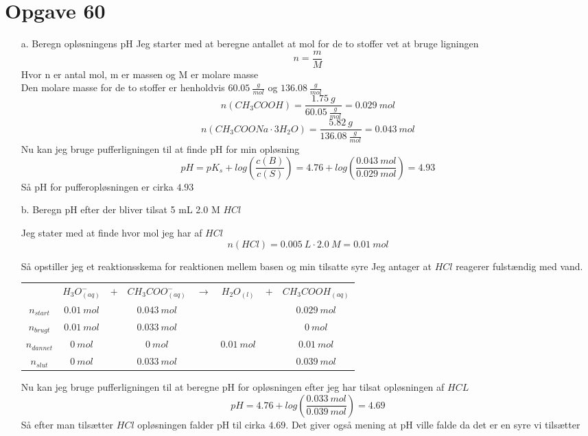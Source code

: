 \documentclass[12pt]{article}
\begin{document}
\section*{Opgave 60}
\begin{enumerate}
  \item[a.] Beregn opløsningens pH
Jeg starter med at beregne antallet at mol for de to stoffer vet at bruge ligningen
$$n = \frac{m}{M}$$
Hvor n er antal mol, m er massen og M er molare masse\\
Den molare masse for de to stoffer er henholdvis $60.05 \ \frac{g}{mol}$ og $136.08 \ \frac{g}{mol}$
$$n(CH_3COOH) = \frac{1.75 \ g}{60.05 \ \frac{g}{mol}} = 0.029 \ mol$$
$$n(CH_3COONa \cdot 3H_2O) = \frac{5.82 \ g}{136.08 \ \frac{g}{mol}} = 0.043 \ mol$$
Nu kan jeg bruge pufferligningen til at finde pH for min opløsning
$$pH = pK_s + log(\frac{c(B)}{c(S)}) = 4.76 + log(\frac{0.043 \ mol}{0.029 \ mol}) = 4.93$$
Så pH for pufferopløsningen er cirka $4.93$

  \item[b.] Beregn pH efter der bliver tilsat 5 mL 2.0 M $HCl$

Jeg stater med at finde hvor mol jeg har af $HCl$
$$n(HCl) = 0.005 \ L \cdot 2.0 \ M = 0.01 \ mol$$

Så opstiller jeg et reaktionsskema for reaktionen mellem basen og min tilsatte syre
Jeg antager at $HCl$ reagerer fulstændig med vand.

\begin{center}
  \begin{tabular}{c c c c c c c c}

    & $H_3O^{-}_(aq)$ & $+$ & $CH_3COO^{-}_{(aq)}$ & $\rightarrow$ & $H_2O_{(l)}$ & $+$ & $CH_3COOH_{(aq)}$\\
    $n_{start}$ & $0.01 \ mol$ && $0.043 \ mol$ &&&& $0.029 \ mol$\\
    $n_{brugt}$ & $0.01 \ mol$ && $0.033 \ mol$ &&&& $0 \ mol$\\
    $n_{dannet}$ & $0 \ mol$ && $0 \ mol$ && $0.01 \ mol$ && $0.01 \ mol$\\
    $n_{slut}$ & $0 \ mol$ && $0.033 \ mol$ &&&& $0.039 \ mol$

  \end{tabular}
\end{center}

Nu kan jeg bruge pufferligningen til at beregne pH for opløsningen efter jeg har tilsat opløsningen af $HCL$
$$pH = 4.76 + log(\frac{0.033 \ mol}{0.039 \ mol}) = 4.69$$
Så efter man tilsætter $HCl$ opløsningen falder pH til cirka $4.69$. Det giver også mening at pH ville falde da det er en syre vi tilsætter

\end{enumerate}
\end{document}
